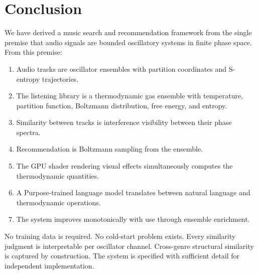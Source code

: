 \documentclass[11pt,twocolumn,a4paper]{article}
\begin{document}
\section{Conclusion}
\label{sec:conclusion}

We have derived a music search and recommendation framework from the
single premise that audio signals are bounded oscillatory systems in
finite phase space. From this premise:

\begin{enumerate}[leftmargin=*,itemsep=2pt]
\item Audio tracks are oscillator ensembles with partition coordinates
  and S-entropy trajectories.
\item The listening library is a thermodynamic gas ensemble with
  temperature, partition function, Boltzmann distribution, free energy,
  and entropy.
\item Similarity between tracks is interference visibility between
  their phase spectra.
\item Recommendation is Boltzmann sampling from the ensemble.
\item The GPU shader rendering visual effects simultaneously computes
  the thermodynamic quantities.
\item A Purpose-trained language model translates between natural
  language and thermodynamic operations.
\item The system improves monotonically with use through ensemble
  enrichment.
\end{enumerate}

No training data is required. No cold-start problem exists. Every
similarity judgment is interpretable per oscillator channel. Cross-genre
structural similarity is captured by construction. The system is
specified with sufficient detail for independent implementation.

\vspace{6pt}


\end{document}
